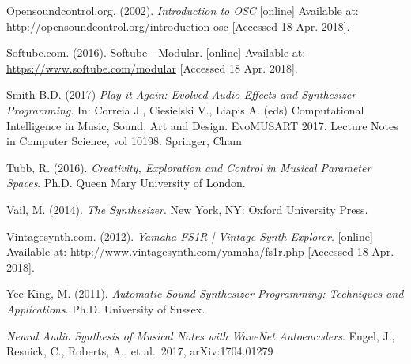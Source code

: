 \documentclass[11pt, oneside]{report}   	%
\begin{document}
\begin{thebibliography}{9}
Opensoundcontrol.org. (2002). \emph{Introduction to OSC} [online] Available at: \url{http://opensoundcontrol.org/introduction-osc} [Accessed 18 Apr. 2018].

Softube.com. (2016). Softube - Modular. [online] Available at: \url{https://www.softube.com/modular} [Accessed 18 Apr. 2018].

Smith B.D. (2017) \emph{Play it Again: Evolved Audio Effects and Synthesizer Programming}. In: Correia J., Ciesielski V., Liapis A. (eds) Computational Intelligence in Music, Sound, Art and Design. EvoMUSART 2017. Lecture Notes in Computer Science, vol 10198. Springer, Cham

Tubb, R. (2016). \emph{Creativity, Exploration and Control in Musical Parameter Spaces}. Ph.D. Queen Mary University of London.

Vail, M. (2014). \emph{The Synthesizer}. New York, NY: Oxford University Press.

Vintagesynth.com. (2012). \emph{Yamaha FS1R | Vintage Synth Explorer}. [online] Available at: \url{http://www.vintagesynth.com/yamaha/fs1r.php} [Accessed 18 Apr. 2018].

Yee-King, M. (2011). \emph{Automatic Sound Synthesizer Programming: Techniques and Applications}. Ph.D. University of Sussex.

 \emph{Neural Audio Synthesis of Musical Notes with WaveNet Autoencoders}. Engel, J., Resnick, C., Roberts, A., et al.\ 2017, arXiv:1704.01279 

\end{thebibliography}
\end{document}
